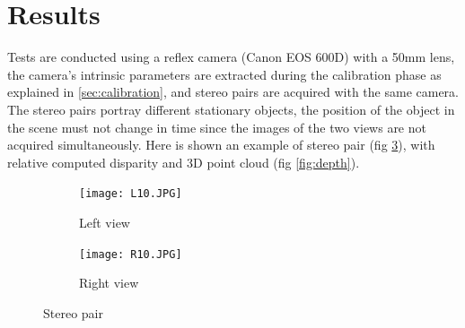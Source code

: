 \documentclass[12pt]{amsart}
\begin{document}
\section*{Results}
Tests are conducted using a reflex camera (Canon EOS 600D) with a 50mm lens, 
the camera's intrinsic parameters are extracted during the calibration phase as explained in \ref{sec:calibration}, and stereo pairs are acquired
with the same camera. The stereo pairs portray different stationary objects, the position of the object in the scene must not change in time since the images
of the two views are not acquired simultaneously.
Here is shown an example of stereo pair (fig \ref{fig:stereo}), with relative computed disparity and 3D point cloud (fig \ref{fig:depth}).\\
\begin{figure}[h]
    \centering
    \begin{subfigure}{.5\textwidth}
      \centering
      \texttt{[image: L10.JPG]}
      \caption{Left view}
      \label{fig:10left}
    \end{subfigure}%
    \begin{subfigure}{.5\textwidth}
      \centering
      \texttt{[image: R10.JPG]}
      \caption{Right view}
      \label{fig:10right}
    \end{subfigure}
    \caption{Stereo pair}
    \label{fig:stereo}
\end{figure}
\end{document}
